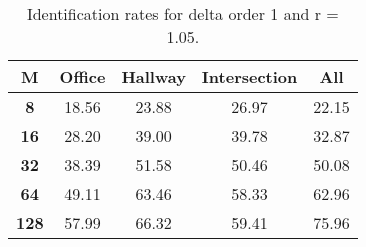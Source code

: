 \begin{table}[h]
    \small
    \centering
    \begin{tabular}{|c|c|c|c|l|}    
    \hline
    {\bf M} & {\bf Office} & {\bf Hallway} & {\bf Intersection} &     \multicolumn{1}{c|}{{\bf All}} \\ \hline
    {\bf 8} & 18.56 & 23.88 & 26.97 & 22.15 \\ \hline
    {\bf 16} & 28.20 & 39.00 & 39.78 & 32.87 \\ \hline
    {\bf 32} & 38.39 & 51.58 & 50.46 & 50.08 \\ \hline
    {\bf 64} & 49.11 & 63.46 & 58.33 & 62.96 \\ \hline
    {\bf 128} & 57.99 & 66.32 & 59.41 & 75.96 \\ \hline
    \end{tabular}
    \caption{Identification rates for delta order 1 and r = 1.05.}    
    \label{tab:identify_speakers_1.05_mit_19_1}
\end{table}
